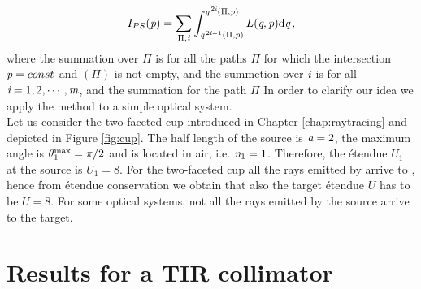 \begin{equation}
I_{PS}(\textit{p}) = \sum_{\Pi, \textit{i} }\int_{\textit{q}^{\,2\textit{i}-1}(\Pi, \textit{p})}^{\textit{q}^{\,2\textit{i}}( \Pi, \textit{p})}L(\textit{q}, \textit{p})\textrm{d}\textit{q}\,,
\label{eq:Ips}
\end{equation}
where the summation over $\Pi$ is for all the paths $\Pi$ for which the intersection $\textit{p} = const$ and $(\Pi)$ is not empty, and the summetion over $\textit{i}$ is for all $\textit{i} = 1,2, \cdots, \textit{m}$, and the summation for the path $\Pi$ 
In order to clarify our idea we apply the method to a simple optical system.
\\ \indent Let us consider the two-faceted cup introduced in Chapter \ref{chap:raytracing} and depicted in Figure \ref{fig:cup}. The half length of the source is $\textit{a}=2$, the maximum angle is $\theta_1^{\textrm{max}} = \pi/2$ and  is located in air, i.e. $\textit{n}_1=1$. Therefore, the \'{e}tendue $U_1 $ at the source is $U_1=8$. For the two-faceted cup all the rays emitted by  arrive to , hence from \'{e}tendue conservation we obtain that also the target \'{e}tendue $U$ has to be $U = 8$.
For some optical systems, not all the rays emitted by the source arrive to the target.  



\section{Results for a TIR collimator}

